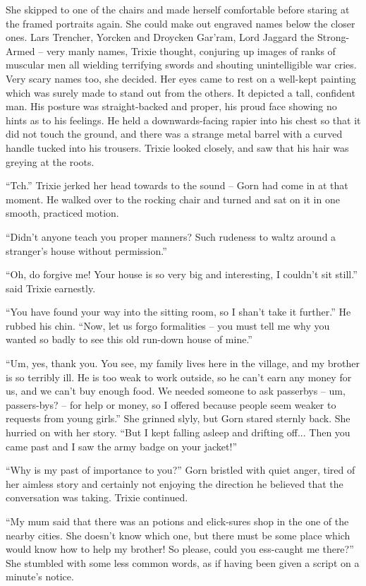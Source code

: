 She skipped to one of the chairs and made herself comfortable before staring at
the framed portraits again. She could make out engraved names below the closer
ones. Lars Trencher, Yorcken and Droycken Gar'ram, Lord Jaggard the Strong-Armed
-- very manly names, Trixie thought, conjuring up images of ranks of muscular
men all wielding terrifying swords and shouting unintelligible war cries. Very
scary names too, she decided. Her eyes came to rest on a well-kept painting
which was surely made to stand out from the others. It depicted a tall,
confident man. His posture was straight-backed and proper, his proud face
showing no hints as to his feelings.  He held a downwards-facing rapier into his
chest so that it did not touch the ground, and there was a strange metal barrel
with a curved handle tucked into his trousers. Trixie looked closely, and saw
that his hair was greying at the roots.

``Tch.'' Trixie jerked her head towards to the sound -- Gorn had come in at that
moment. He walked over to the rocking chair and turned and sat on it in one
smooth, practiced motion.

``Didn't anyone teach you proper manners? Such rudeness to waltz around a
stranger's house without permission.''

``Oh, do forgive me! Your house is so very big and interesting, I couldn't sit
still.'' said Trixie earnestly.

``You have found your way into the sitting room, so I shan't take it further.''
He rubbed his chin. ``Now, let us forgo formalities -- you must tell me why you
wanted so badly to see this old run-down house of mine.''

``Um, yes, thank you. You see, my family lives here in the village, and my
brother is so terribly ill. He is too weak to work outside, so he can't earn any
money for us, and we can't buy enough food. We needed someone to ask passerbys
-- um, passers-bys?  -- for help or money, so I offered because people seem
weaker to requests from young girls.'' She grinned slyly, but Gorn stared
sternly back.  She hurried on with her story. ``But I kept falling asleep and
drifting off...  Then you came past and I saw the army badge on your jacket!''

``Why is my past of importance to you?'' Gorn bristled with quiet anger, tired
of her aimless story and certainly not enjoying the direction he believed that
the conversation was taking. Trixie continued.

``My mum said that there was an potions and elick-sures shop in the one of the
nearby cities. She doesn't know which one, but there must be some place which
would know how to help my brother! So please, could you ess-caught me there?''
She stumbled with some less common words, as if having been given a script on a
minute's notice.

